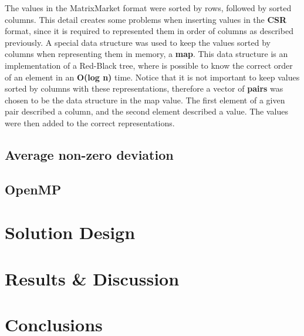 \documentclass[12pt]{article}
\begin{document}
\hfill

\par The values in the MatrixMarket format were sorted by rows, followed by sorted columns. This detail creates some problems when inserting values in the \textbf{CSR} format, since it is required to represented them in order of columns as described previously. A special data structure was used to keep the values sorted by columns when representing them in memory, a \textbf{map}. This data structure is an implementation of a Red-Black tree, where is possible to know the correct order of an element in an \textbf{O(log n)} time. Notice that it is not important to keep values sorted by columns with these representations, therefore a vector of \textbf{pairs} was chosen to be the data structure in the map value. The first element of a given pair described a column, and the second element described a value. The values were then added to the correct representations.

\subsection*{Average non-zero deviation}



\subsection*{OpenMP}

\par 

 
\section*{Solution Design}


\section*{Results \& Discussion}


\pagebreak
\section*{Conclusions}

 
\end{document}
